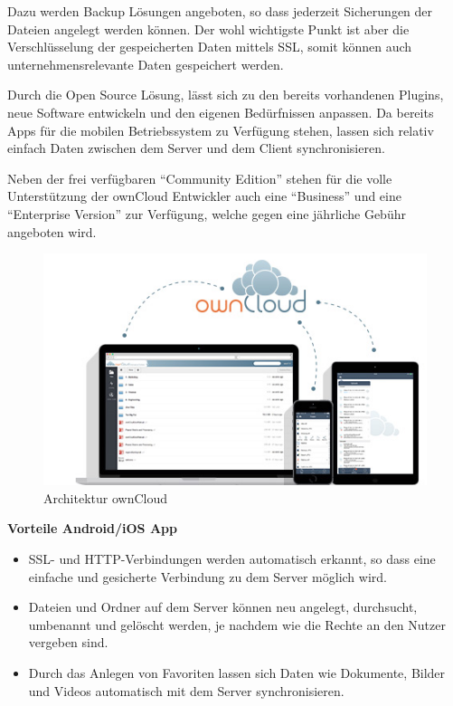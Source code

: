 Dazu werden Backup Lösungen angeboten, so dass jederzeit Sicherungen der Dateien angelegt werden können. Der wohl wichtigste Punkt ist aber die Verschlüsselung der gespeicherten Daten mittels \ac{SSL}, somit können auch unternehmensrelevante Daten gespeichert werden.

Durch die Open Source Lösung, lässt sich zu den bereits vorhandenen Plugins, neue Software entwickeln und den eigenen Bedürfnissen anpassen. Da bereits Apps für die mobilen Betriebssystem zu Verfügung stehen, lassen sich relativ einfach Daten zwischen dem Server und dem Client synchronisieren.

Neben der frei verfügbaren ``Community Edition'' stehen für die volle Unterstützung der ownCloud Entwickler auch eine ``Business'' und eine ``Enterprise Version'' zur Verfügung, welche gegen eine jährliche Gebühr angeboten wird.\cite[]{WEB:OWNCLOUD:2014}

\hspace{2 cm}

\begin{figure}[htb]
	\includegraphics[width=\textwidth]{Bilder/architecture}
	\caption{Architektur ownCloud}
	\label{Datenerfassung}
\end{figure}

\hspace{2 cm}

\textbf{Vorteile Android/iOS App}


\begin{itemize}

	\item SSL- und HTTP-Verbindungen werden automatisch erkannt, so dass eine einfache und gesicherte Verbindung zu dem Server möglich wird.\cite[]{WEB:OWNCLOUD:2014}

	\item Dateien und Ordner auf dem Server können neu angelegt, durchsucht, umbenannt und gelöscht werden, je nachdem wie die Rechte an den Nutzer vergeben sind.\cite[]{WEB:OWNCLOUD:2014}

	\item Durch das Anlegen von Favoriten lassen sich Daten wie Dokumente, Bilder und Videos automatisch mit dem Server synchronisieren.\cite[]{WEB:OWNCLOUD:2014}

\end{itemize}

